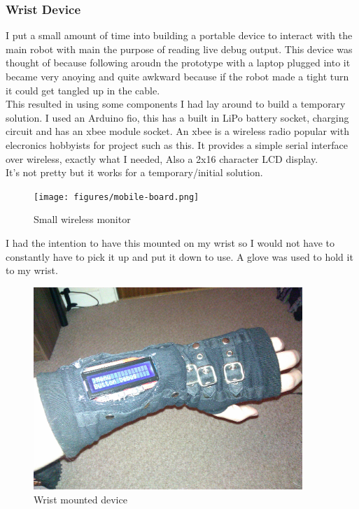 \documentclass[11pt,fleqn,twoside]{article}
\begin{document}
\subsubsection{Wrist Device}
I put a small amount of time into building a portable device to interact with the main robot with main the purpose of reading live debug output.  This device was thought of because following aroudn the prototype with a laptop plugged into it became very anoying and quite awkward because if the robot made a tight turn it could get tangled up in the cable.
\\This resulted in using some components I had lay around to build a temporary solution.  I used an Arduino fio, this has a built in LiPo battery socket, charging circuit and has an xbee module socket.  An xbee is a wireless radio popular with elecronics hobbyists for project such as this.  It provides a simple serial interface over wireless, exactly what I needed, Also a 2x16 character LCD display.
\\It's not pretty but it works for a temporary/initial solution.
\begin{figure}[h]
\centering
        \texttt{[image: figures/mobile-board.png]}
        \caption{Small wireless monitor}
        \label{Small wireless monitor}
\end{figure}
\clearpage
I had the intention to have this mounted on my wrist so I would not have to constantly have to pick it up and put it down to use.  A glove was used to hold it to my wrist.
\begin{figure}[h]
\centering
        \includegraphics[width=4.0in] {figures/wrist-device.jpg}
        \caption{Wrist mounted device}
        \label{Wrist mounted device}
\end{figure}
\end{document}
